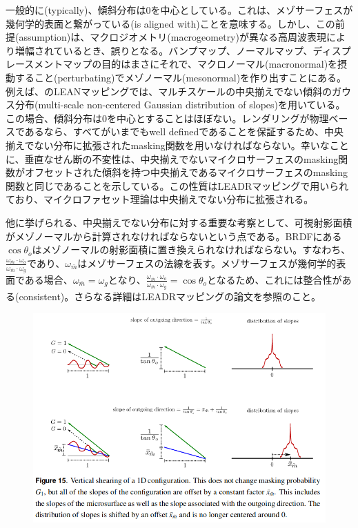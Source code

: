 \documentclass[a4j,xelatex,ja=standard]{bxjsarticle}
\begin{document}
一般的に(typically)、傾斜分布は$0$を中心としている。これは、メゾサーフェスが幾何学的表面と繋がっている(is aligned with)ことを意味する。しかし、この前提(assumption)は、マクロジオメトリ(macrogeometry)が異なる高周波表現により増幅されているとき、誤りとなる。バンプマップ、ノーマルマップ、ディスプレースメントマップの目的はまさにそれで、マクロノーマル(macronormal)を摂動すること(perturbating)でメゾノーマル(mesonormal)を作り出すことにある。例えば、\citeauthor{Olano2010}のLEANマッピング\cite{Olano2010}では、マルチスケールの中央揃えでない傾斜のガウス分布(multi-scale non-centered Gaussian distribution of slopes)を用いている。この場合、傾斜分布は$0$を中心とすることはほぼない。レンダリングが物理ベースであるなら、すべてがいまでもwell definedであることを保証するため、中央揃えでない分布に拡張されたmasking関数を用いなければならない。幸いなことに、垂直なせん断の不変性は、中央揃えでないマイクロサーフェスのmasking関数がオフセットされた傾斜を持つ中央揃えであるマイクロサーフェスのmasking関数と同じであることを示している。この性質はLEADRマッピングで用いられており\cite{Dupuy2013}、マイクロファセット理論は中央揃えでない分布に拡張される。

他に挙げられる、中央揃えでない分布に対する重要な考察として、可視射影面積がメゾノーマルから計算されなければならないという点である。BRDFにある$\cos\theta_o$はメゾノーマルの射影面積に置き換えられなければならない。すなわち、$\frac{\omega_{\bar{m}} \cdot \omega_o}{\omega_{\bar{m}} \cdot \omega_g}$であり、$\omega_{\bar{m}}$はメゾサーフェスの法線を表す。メゾサーフェスが幾何学的表面である場合、$\omega_{\bar{m}} = \omega_g$となり、$\frac{\omega_{\bar{m}} \cdot \omega_o}{\omega_{\bar{m}} \cdot \omega_g} = \cos\theta_o$となるため、これには整合性がある(consistent)。さらなる詳細はLEADRマッピングの論文を参照のこと。

\begin{figure}
    \includegraphics[width=\textwidth]{Figure15.png}
    \caption{}
    \label{fig:15}
\end{figure}
\end{document}
